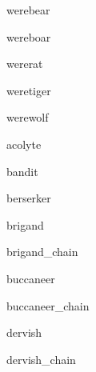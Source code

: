 \documentclass[letterpaper,serif]{module}
\begin{document}
\begin{newmonster}{werebear}\end{newmonster}

\begin{newmonster}{wereboar}\end{newmonster}

\begin{newmonster}{wererat}\end{newmonster}

\begin{newmonster}{weretiger}\end{newmonster}

\begin{newmonster}{werewolf}\end{newmonster}

\begin{newmonster}{acolyte}\end{newmonster}

\begin{newmonster}{bandit}\end{newmonster}

\begin{newmonster}{berserker}\end{newmonster}

\begin{newmonster}{brigand}\end{newmonster}

\begin{newmonster}{brigand_chain}\end{newmonster}

\begin{newmonster}{buccaneer}\end{newmonster}

\begin{newmonster}{buccaneer_chain}\end{newmonster}

\begin{newmonster}{dervish}\end{newmonster}

\begin{newmonster}{dervish_chain}\end{newmonster}
\end{document}
